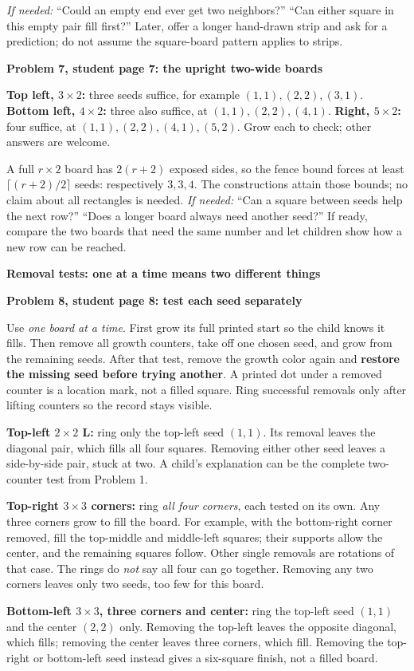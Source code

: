 \documentclass[11pt]{article}
\newcommand{\head}[1]{\par\textbf{\large #1}\par}
\newcommand{\sub}[1]{\par\textbf{#1}\par}
\newcommand{\hint}[1]{\textit{If needed:} #1}
\begin{document}
\hint{``Could an empty end ever get two neighbors?'' ``Can either square in this empty pair fill first?''} Later, offer a longer hand-drawn strip and ask for a prediction; do not assume the square-board pattern applies to strips.

\sub{Problem 7, student page 7: the upright two-wide boards}
\textbf{Top left, $3\times2$:} three seeds suffice, for example $(1,1),(2,2),(3,1)$. \textbf{Bottom left, $4\times2$:} three also suffice, at $(1,1),(2,2),(4,1)$. \textbf{Right, $5\times2$:} four suffice, at $(1,1),(2,2),(4,1),(5,2)$. Grow each to check; other answers are welcome.

A full $r\times2$ board has $2(r+2)$ exposed sides, so the fence bound forces at least $\lceil(r+2)/2\rceil$ seeds: respectively $3,3,4$. The constructions attain those bounds; no claim about all rectangles is needed. \hint{``Can a square between seeds help the next row?'' ``Does a longer board always need another seed?''} If ready, compare the two boards that need the same number and let children show how a new row can be reached.

\newpage
\head{Removal tests: one at a time means two different things}
\sub{Problem 8, student page 8: test each seed separately}
Use \emph{one board at a time}. First grow its full printed start so the child knows it fills. Then remove all growth counters, take off one chosen seed, and grow from the remaining seeds. After that test, remove the growth color again and \textbf{restore the missing seed before trying another}. A printed dot under a removed counter is a location mark, not a filled square. Ring successful removals only after lifting counters so the record stays visible.

\textbf{Top-left $2\times2$ L:} ring only the top-left seed $(1,1)$. Its removal leaves the diagonal pair, which fills all four squares. Removing either other seed leaves a side-by-side pair, stuck at two. A child's explanation can be the complete two-counter test from Problem 1.

\textbf{Top-right $3\times3$ corners:} ring \emph{all four corners}, each tested on its own. Any three corners grow to fill the board. For example, with the bottom-right corner removed, fill the top-middle and middle-left squares; their supports allow the center, and the remaining squares follow. Other single removals are rotations of that case. The rings do \emph{not} say all four can go together. Removing any two corners leaves only two seeds, too few for this board.

\textbf{Bottom-left $3\times3$, three corners and center:} ring the top-left seed $(1,1)$ and the center $(2,2)$ only. Removing the top-left leaves the opposite diagonal, which fills; removing the center leaves three corners, which fill. Removing the top-right or bottom-left seed instead gives a six-square finish, not a filled board.
\end{document}
